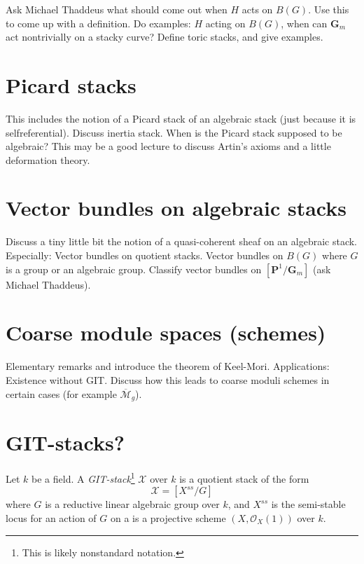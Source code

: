 \noindent
Ask Michael Thaddeus what should come out when $H$ acts on $B(G)$.
Use this to come up with a definition. Do examples: $H$ acting on
$B(G)$, when can $\mathbf{G}_m$ act nontrivially on a stacky curve?
Define toric stacks, and give examples.

\section{Picard stacks}
\label{section-picard}

\noindent
This includes the notion of a Picard stack of an algebraic stack
(just because it is selfreferential). Discuss inertia stack.
When is the Picard stack supposed to be algebraic? This may be a good
lecture to discuss Artin's axioms and a little deformation theory.

\section{Vector bundles on algebraic stacks}
\label{section-vectorbundles}

\noindent
Discuss a tiny little bit the notion of a quasi-coherent sheaf on
an algebraic stack. Especially: Vector bundles on quotient stacks.
Vector bundles on $B(G)$ where $G$ is a group or an algebraic group.
Classify vector bundles on $[\mathbf{P}^1/\mathbf{G}_m]$
(ask Michael Thaddeus).


\section{Coarse module spaces (schemes)}
\label{section-coarse}

\noindent
Elementary remarks and introduce the theorem of Keel-Mori.
Applications: Existence without GIT. Discuss how this leads to
coarse moduli schemes in certain cases (for example
$\overline{\mathcal{M}}_g$).


\section{GIT-stacks?}
\label{section-GIT}

\begin{definition}
\label{definition-GIT-stack}
Let $k$ be a field.
A {\it GIT-stack}\footnote{This is likely nonstandard notation.}
$\mathcal{X}$ over $k$ is a quotient stack of the form
$$
\mathcal{X} = [X^{ss}/G]
$$
where $G$ is a reductive linear algebraic group over $k$,
and $X^{ss}$ is the semi-stable locus for an action of $G$ on
a is a projective scheme $(X, \mathcal{O}_X(1))$ over $k$.
\end{definition}

